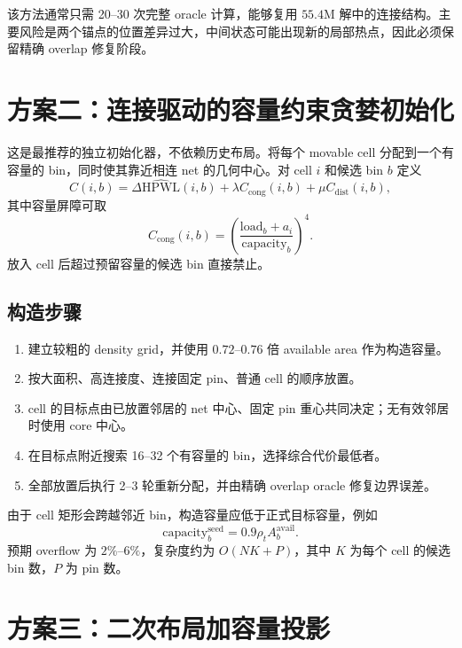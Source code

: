 \documentclass[11pt,a4paper]{ctexart}
\begin{document}
该方法通常只需 20--30 次完整 oracle 计算，能够复用 $55.4$M 解中的连接结构。主要风险是两个锚点的位置差异过大，中间状态可能出现新的局部热点，因此必须保留精确 overlap 修复阶段。

\section{方案二：连接驱动的容量约束贪婪初始化}

这是最推荐的独立初始化器，不依赖历史布局。将每个 movable cell 分配到一个有容量的 bin，同时使其靠近相连 net 的几何中心。对 cell $i$ 和候选 bin $b$ 定义
\begin{equation}
  C(i,b)=\Delta\widehat{\mathrm{HPWL}}(i,b)
  +\lambda C_{\mathrm{cong}}(i,b)
  +\mu C_{\mathrm{dist}}(i,b),
\end{equation}
其中容量屏障可取
\begin{equation}
  C_{\mathrm{cong}}(i,b)=
  \left(\frac{\mathrm{load}_b+a_i}{\mathrm{capacity}_b}\right)^4.
\end{equation}
放入 cell 后超过预留容量的候选 bin 直接禁止。

\subsection{构造步骤}
\begin{enumerate}
  \item 建立较粗的 density grid，并使用 $0.72$--$0.76$ 倍 available area 作为构造容量。
  \item 按大面积、高连接度、连接固定 pin、普通 cell 的顺序放置。
  \item cell 的目标点由已放置邻居的 net 中心、固定 pin 重心共同决定；无有效邻居时使用 core 中心。
  \item 在目标点附近搜索 16--32 个有容量的 bin，选择综合代价最低者。
  \item 全部放置后执行 2--3 轮重新分配，并由精确 overlap oracle 修复边界误差。
\end{enumerate}

由于 cell 矩形会跨越邻近 bin，构造容量应低于正式目标容量，例如
\begin{equation}
  \mathrm{capacity}^{\mathrm{seed}}_b=0.9\rho_t A_b^{\mathrm{avail}}.
\end{equation}
预期 overflow 为 $2\%$--$6\%$，复杂度约为 $O(NK+P)$，其中 $K$ 为每个 cell 的候选 bin 数，$P$ 为 pin 数。

\section{方案三：二次布局加容量投影}
\end{document}
